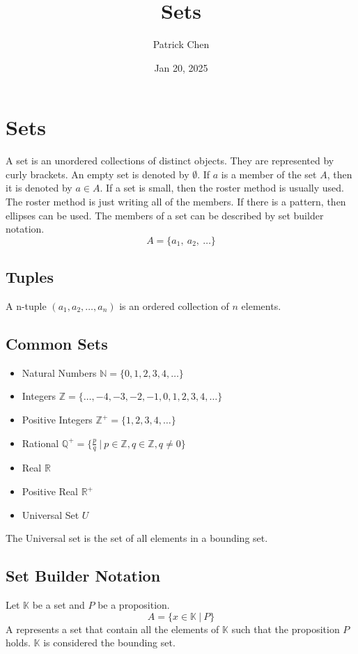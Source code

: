 \documentclass{article}
\title{Sets}
\author{Patrick Chen}
\date{Jan 20, 2025}
\theoremstyle{mytheoremstyle}
\theoremstyle{mytheoremstyle}
\theoremstyle{myproblemstyle}
\begin{document}
    \maketitle
    \section*{Sets}
    A set is an unordered collections of distinct objects. They are represented
    by curly brackets. An empty set is denoted by $\emptyset$. If $a$ is a
    member of the set $A$, then it is denoted by $a\in A$. If a set is small,
    then the roster method is usually used. The roster method is just writing
    all of the members. If there is a pattern, then ellipses can be used. The
    members of a set can be described by set builder notation.
    \[
        A = \{a_1,\ a_2,\ \dots\}
    \]
    \subsection*{Tuples}
    A n-tuple $(a_1,a_2,\dots,a_n)$ is an ordered collection of $n$ elements.
    \subsection*{Common Sets}
    \begin{itemize}
        \item Natural Numbers $\mathbb{N} = \{0,1,2,3,4,\dots\}$
        \item Integers $\mathbb{Z} = \{\dots,-4,-3,-2,-1,0,1,2,3,4,\dots\}$
        \item Positive Integers $\mathbb{Z}^+ = \{1,2,3,4,\dots\}$
        \item Rational $\mathbb{Q}^+ = \{ \frac{p}{q}\ |\ p\in\mathbb{Z},q\in\mathbb{Z},q\ne 0\}$
        \item Real $\mathbb{R}$
        \item Positive Real $\mathbb{R}^+$
        \item Universal Set $U$
    \end{itemize}
    The Universal set is the set of all elements in a bounding set.

    \subsection*{Set Builder Notation}
    Let $\mathbb{K}$ be a set and $P$ be a proposition.
    \[
        A = \{x \in \mathbb{K}\ |\ P\}
    \]
    A represents a set that contain all the elements of $\mathbb{K}$ such that
    the proposition $P$ holds. $\mathbb{K}$ is considered the bounding set.
\end{document}
